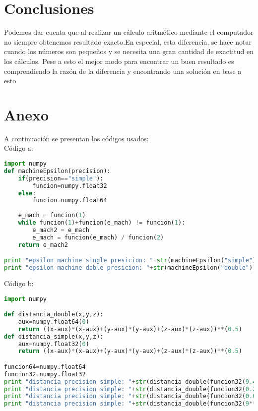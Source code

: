 \documentclass[a4paper,11pt]{article}
\begin{document}
\section{Conclusiones}

Podemos dar cuenta que al realizar un cálculo aritmético mediante el computador no siempre obtenemos resultado exacto.En especial, esta diferencia, se hace notar cuando los números son pequeños y se necesita una gran cantidad de exactitud en los cálculos. Pese a esto el mejor modo para encontrar un buen resultado es comprendiendo la razón de la diferencia y encontrando una solución en base a esto

\section{Anexo}
A continuación se presentan los códigos usados:\\
Código a:
\begin{lstlisting}[frame=single, language=Python]
import numpy           
def machineEpsilon(precision): 
    if(precision=="simple"):  
        funcion=numpy.float32
    else:         
        funcion=numpy.float64
        
    e_mach = funcion(1) 
    while funcion(1)+funcion(e_mach) != funcion(1): 
        e_mach2 = e_mach 
        e_mach = funcion(e_mach) / funcion(2) 
    return e_mach2 

print "epsilon machine single presicion: "+str(machineEpsilon("simple")) 
print "epsilon machine doble presicion: "+str(machineEpsilon("double")) 
\end{lstlisting}
Código b:
\begin{lstlisting}[frame=single, language=Python]
import numpy

def distancia_double(x,y,z):
    aux=numpy.float64(0)
    return ((x-aux)*(x-aux)+(y-aux)*(y-aux)+(z-aux)*(z-aux))**(0.5)
def distancia_simple(x,y,z):
    aux=numpy.float32(0)
    return ((x-aux)*(x-aux)+(y-aux)*(y-aux)+(z-aux)*(z-aux))**(0.5)

funcion64=numpy.float64
funcion32=numpy.float32
print "distancia precision simple: "+str(distancia_double(funcion32(9.4**5),funcion32(0.7**5),funcion32(7**5)))+"  distancia precision doble: "+str(distancia_double(funcion64(9.4**5),funcion64(0.7**5),funcion64(7**5)))
print "distancia precision simple: "+str(distancia_double(funcion32(0.2**5),funcion32(9.5**5),funcion32(6.1**5)))+"  distancia precision doble: "+str(distancia_double(funcion64(0.2**5),funcion64(9.5**5),funcion64(6.1**5)))
print "distancia precision simple: "+str(distancia_double(funcion32(0.6**5),funcion32(3.1**5),funcion32(2.5**5)))+"  distancia precision doble: "+str(distancia_double(funcion64(0.6**5),funcion64(3.1**5),funcion64(2.5**5)))
print "distancia precision simple: "+str(distancia_double(funcion32(9**5),funcion32(3.5**5),funcion32(4**5)))+"  distancia precision doble: "+str(distancia_double(funcion64(9**5),funcion64(3.5**5),funcion64(4**5)))
\end{lstlisting}
\end{document}

